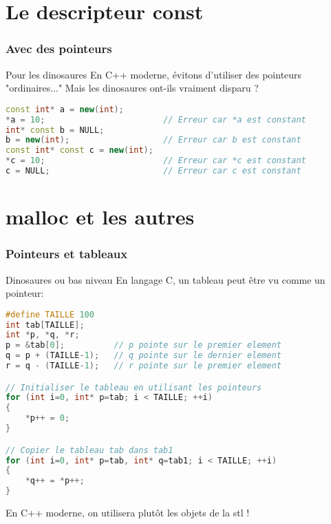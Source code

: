 \documentclass{beamer}
\begin{document}
\section{Le descripteur const}

\begin{frame}[fragile=singleslide,shrink=20]
\frametitle {Avec des pointeurs}

\begin{block}{Pour les dinosaures}
En C++ moderne, évitons d'utiliser des pointeurs "ordinaires..." Mais les dinosaures ont-ils vraiment disparu ?
\end{block}

\begin{lstlisting}[language=c++]
const int* a = new(int);
*a = 10;                        // Erreur car *a est constant
int* const b = NULL;
b = new(int);                   // Erreur car b est constant
const int* const c = new(int);
*c = 10;                        // Erreur car *c est constant
c = NULL;                       // Erreur car c est constant
\end{lstlisting}

\end{frame}

\section{malloc et les autres}

\begin{frame}[fragile=singleslide,shrink=20]
\frametitle{Pointeurs et tableaux}

\begin{block}{Dinosaures ou bas niveau}
En langage C, un tableau peut être vu comme un pointeur:
\end{block}

\begin{lstlisting}[language=c++]
#define TAILLE 100
int tab[TAILLE];
int *p, *q, *r;
p = &tab[0];          // p pointe sur le premier element
q = p + (TAILLE-1);   // q pointe sur le dernier element
r = q - (TAILLE-1);   // r pointe sur le premier element

// Initialiser le tableau en utilisant les pointeurs
for (int i=0, int* p=tab; i < TAILLE; ++i)
{
    *p++ = 0;
}

// Copier le tableau tab dans tab1
for (int i=0, int* p=tab, int* q=tab1; i < TAILLE; ++i)
{
    *q++ = *p++;
}
\end{lstlisting}

\begin{block}{}
En C++ moderne, on utilisera plutôt les objets de la stl !
\end{block}
\end{frame}
\end{document}
